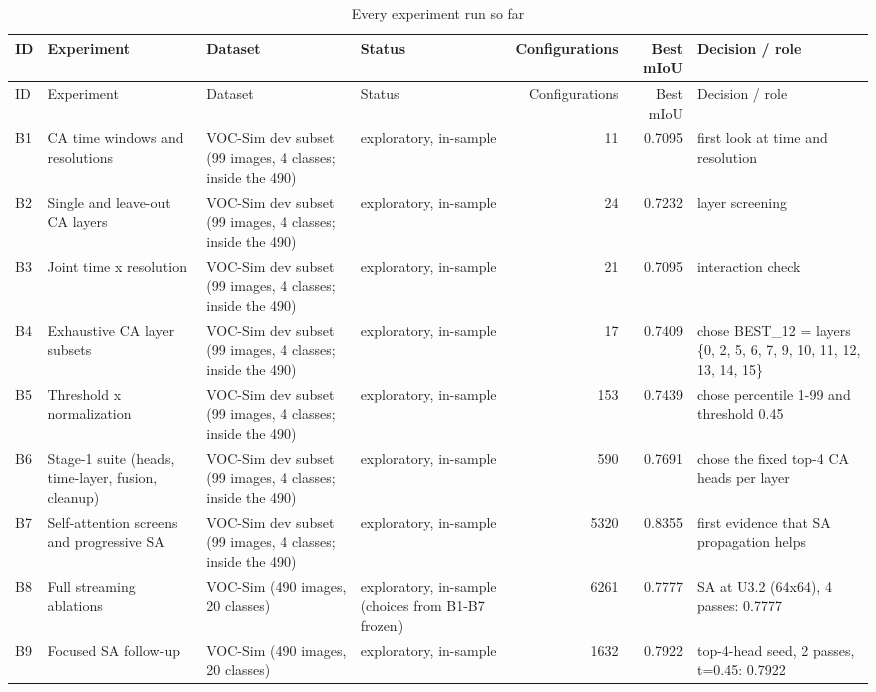 {\scriptsize\setlength{\tabcolsep}{3pt}
\begin{longtable}{>{\raggedright\arraybackslash}p{1.40cm}>{\raggedright\arraybackslash}p{1.96cm}>{\raggedright\arraybackslash}p{2.29cm}>{\raggedright\arraybackslash}p{2.41cm}rr>{\raggedright\arraybackslash}p{3.02cm}}
\caption{Every experiment run so far}\label{tab:ledger}\\
\toprule
ID & Experiment & Dataset & Status & Configurations & Best mIoU & Decision /\allowbreak{} role \\
\midrule
\endfirsthead
\toprule
ID & Experiment & Dataset & Status & Configurations & Best mIoU & Decision /\allowbreak{} role \\
\midrule
\endhead
B1 & CA time windows and resolutions & VOC-Sim dev subset (99 images, 4 classes; inside the 490) & exploratory, in-sample & 11 & 0.7095 & first look at time and resolution \\
B2 & Single and leave-out CA layers & VOC-Sim dev subset (99 images, 4 classes; inside the 490) & exploratory, in-sample & 24 & 0.7232 & layer screening \\
B3 & Joint time x resolution & VOC-Sim dev subset (99 images, 4 classes; inside the 490) & exploratory, in-sample & 21 & 0.7095 & interaction check \\
B4 & Exhaustive CA layer subsets & VOC-Sim dev subset (99 images, 4 classes; inside the 490) & exploratory, in-sample & 17 & 0.7409 & chose BEST\_\allowbreak{}12 = layers \{0, 2, 5, 6, 7, 9, 10, 11, 12, 13, 14, 15\} \\
B5 & Threshold x normalization & VOC-Sim dev subset (99 images, 4 classes; inside the 490) & exploratory, in-sample & 153 & 0.7439 & chose percentile 1-99 and threshold 0.45 \\
B6 & Stage-1 suite (heads, time-layer, fusion, cleanup) & VOC-Sim dev subset (99 images, 4 classes; inside the 490) & exploratory, in-sample & 590 & 0.7691 & chose the fixed top-4 CA heads per layer \\
B7 & Self-attention screens and progressive SA & VOC-Sim dev subset (99 images, 4 classes; inside the 490) & exploratory, in-sample & 5320 & 0.8355 & first evidence that SA propagation helps \\
B8 & Full streaming ablations & VOC-Sim (490 images, 20 classes) & exploratory, in-sample (choices from B1-B7 frozen) & 6261 & 0.7777 & SA at U3.2 (64x64), 4 passes: 0.7777 \\
B9 & Focused SA follow-up & VOC-Sim (490 images, 20 classes) & exploratory, in-sample & 1632 & 0.7922 & top-4-head seed, 2 passes, t=0.45: 0.7922 \\

\end{longtable}}
